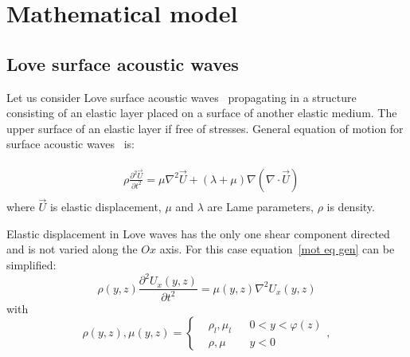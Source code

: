 \section{Mathematical model}
\label{chap:model}
\subsection{Love surface acoustic waves}
\label{saw}
Let us consider Love surface acoustic waves~\cite{} propagating in a structure
consisting of an elastic layer placed on a surface of another elastic medium. The upper surface of
an elastic layer if free of stresses. General equation of motion for surface acoustic
waves~\cite{Landau_theoryofelasticity} is:

\begin{equation}
\label{mot eq gen}
\begin{aligned}
\begin{aligned}&\rho \frac{\partial ^2\vec{U}}{\partial t^2}=\mu \nabla^2 \vec{U} + (\lambda+\mu) \nabla (\nabla \cdot \vec{U})  \end{aligned}
\end{aligned}
\end{equation}
where $\vec{U}$ is elastic displacement, $\mu$ and $\lambda$ are Lame parameters, $\rho$ is density. 

Elastic displacement in Love waves has the only one shear component directed and is not varied along
the $Ox$ axis. For this case equation~\eqref{mot eq gen} can be simplified:
\begin{equation}
	\label{mot eq}
	\rho(y,z)\frac{\partial ^2U_x(y,z)}{\partial t^2}=\mu(y,z) \nabla^2 U_x(y,z)
\end{equation}
with
\begin{equation*}
	\rho(y,z), \mu(y,z) = 
	\left\{\begin{aligned}&\rho_l, \mu_l  && 0<y<\varphi(z) \\ &\rho,\mu  && y<0  \end{aligned}\right.,
\end{equation*}
